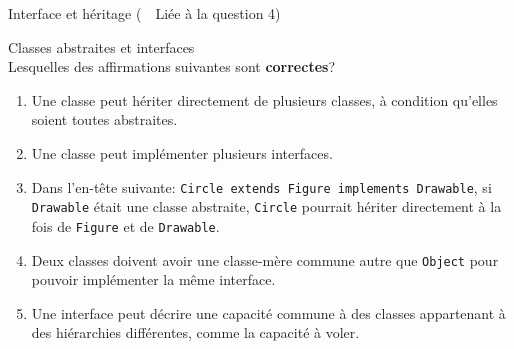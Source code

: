 \begin{Exercice}[15 minutes]{Interface et héritage (\faLink~~Liée à la question 4)}
\begin{solution}
 
\end{solution}
\begin{solution}
 
\end{solution}
\begin{solution}
 
\end{solution}
\begin{solution}
 
\end{solution}

\end{Exercice}

\begin{Exercice}[5 minutes]{Classes abstraites et interfaces} \\
Lesquelles des affirmations suivantes sont \textbf{correctes}?

\begin{enumerate}
    \item Une classe peut hériter directement de plusieurs classes, à condition qu'elles soient toutes abstraites.
    \item Une classe peut implémenter plusieurs interfaces.
    \item Dans l'en-tête suivante: \lstinline|Circle extends Figure implements Drawable|, si \lstinline{Drawable} était une classe abstraite, \lstinline{Circle} pourrait hériter directement à la fois de \lstinline{Figure} et de \lstinline{Drawable}.
    \item Deux classes doivent avoir une classe-mère commune autre que \lstinline{Object} pour pouvoir implémenter la même interface.
    \item Une interface peut décrire une capacité commune à des classes appartenant à des hiérarchies différentes, comme la capacité à voler.
\end{enumerate}


\end{Exercice}
